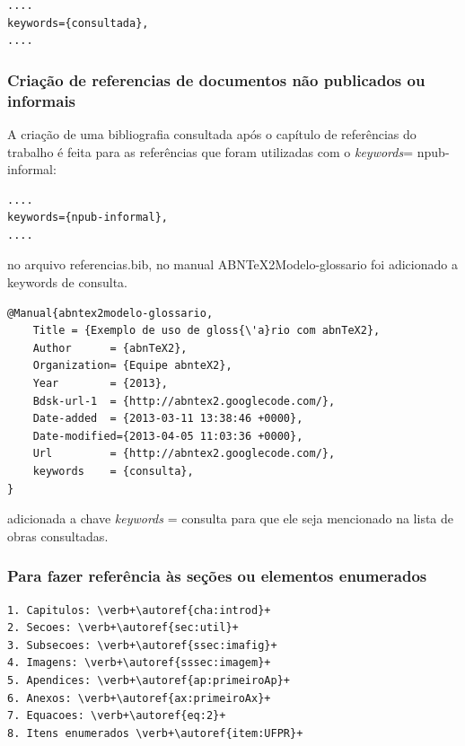 \begin{lstlisting}
....
keywords={consultada},
....
\end{lstlisting}  


\subsubsection{Criação de referencias de documentos não publicados ou informais}

A criação de uma bibliografia consultada após o capítulo de referências do trabalho é feita para as referências que foram utilizadas com o \textit{keywords}= {npub-informal}:

\begin{lstlisting}
....
keywords={npub-informal},
....
\end{lstlisting}  


no arquivo referencias.bib, no manual ABNTeX2Modelo-glossario foi adicionado a keywords de consulta.

\begin{lstlisting}
@Manual{abntex2modelo-glossario,
	Title = {Exemplo de uso de gloss{\'a}rio com abnTeX2},
	Author      = {abnTeX2},
	Organization= {Equipe abnteX2},
	Year        = {2013},
	Bdsk-url-1  = {http://abntex2.googlecode.com/},
	Date-added  = {2013-03-11 13:38:46 +0000},
	Date-modified={2013-04-05 11:03:36 +0000},
	Url         = {http://abntex2.googlecode.com/},
	keywords    = {consulta},
}
\end{lstlisting}

adicionada a chave \textit{keywords} = {consulta} para que ele seja mencionado na lista de obras consultadas.


\subsubsection{Para fazer referência às seções ou elementos enumerados}

\begin{lstlisting}
1. Capitulos: \verb+\autoref{cha:introd}+ 
2. Secoes: \verb+\autoref{sec:util}+ 
3. Subsecoes: \verb+\autoref{ssec:imafig}+
4. Imagens: \verb+\autoref{sssec:imagem}+ 
5. Apendices: \verb+\autoref{ap:primeiroAp}+ 
6. Anexos: \verb+\autoref{ax:primeiroAx}+ 
7. Equacoes: \verb+\autoref{eq:2}+
8. Itens enumerados \verb+\autoref{item:UFPR}+ 
\end{lstlisting}
